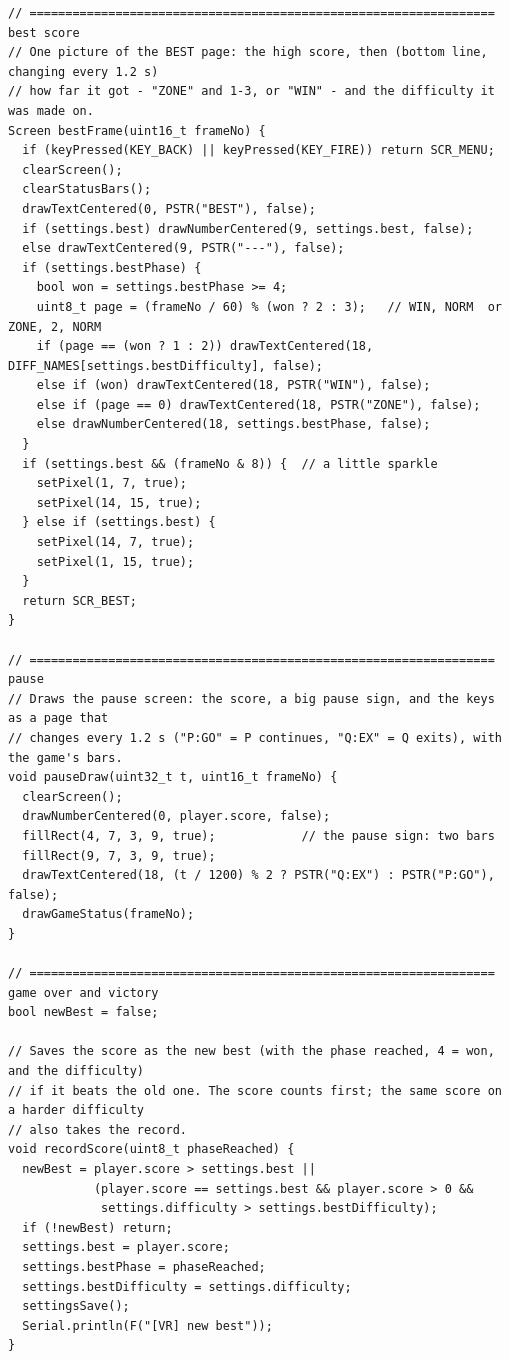 \documentclass[11pt,a4paper]{article}
\begin{document}
\begin{lstlisting}[language=Arduino]
// ================================================================= best score
// One picture of the BEST page: the high score, then (bottom line, changing every 1.2 s)
// how far it got - "ZONE" and 1-3, or "WIN" - and the difficulty it was made on.
Screen bestFrame(uint16_t frameNo) {
  if (keyPressed(KEY_BACK) || keyPressed(KEY_FIRE)) return SCR_MENU;
  clearScreen();
  clearStatusBars();
  drawTextCentered(0, PSTR("BEST"), false);
  if (settings.best) drawNumberCentered(9, settings.best, false);
  else drawTextCentered(9, PSTR("---"), false);
  if (settings.bestPhase) {
    bool won = settings.bestPhase >= 4;
    uint8_t page = (frameNo / 60) % (won ? 2 : 3);   // WIN, NORM  or  ZONE, 2, NORM
    if (page == (won ? 1 : 2)) drawTextCentered(18, DIFF_NAMES[settings.bestDifficulty], false);
    else if (won) drawTextCentered(18, PSTR("WIN"), false);
    else if (page == 0) drawTextCentered(18, PSTR("ZONE"), false);
    else drawNumberCentered(18, settings.bestPhase, false);
  }
  if (settings.best && (frameNo & 8)) {  // a little sparkle
    setPixel(1, 7, true);
    setPixel(14, 15, true);
  } else if (settings.best) {
    setPixel(14, 7, true);
    setPixel(1, 15, true);
  }
  return SCR_BEST;
}

// ================================================================= pause
// Draws the pause screen: the score, a big pause sign, and the keys as a page that
// changes every 1.2 s ("P:GO" = P continues, "Q:EX" = Q exits), with the game's bars.
void pauseDraw(uint32_t t, uint16_t frameNo) {
  clearScreen();
  drawNumberCentered(0, player.score, false);
  fillRect(4, 7, 3, 9, true);            // the pause sign: two bars
  fillRect(9, 7, 3, 9, true);
  drawTextCentered(18, (t / 1200) % 2 ? PSTR("Q:EX") : PSTR("P:GO"), false);
  drawGameStatus(frameNo);
}

// ================================================================= game over and victory
bool newBest = false;

// Saves the score as the new best (with the phase reached, 4 = won, and the difficulty)
// if it beats the old one. The score counts first; the same score on a harder difficulty
// also takes the record.
void recordScore(uint8_t phaseReached) {
  newBest = player.score > settings.best ||
            (player.score == settings.best && player.score > 0 &&
             settings.difficulty > settings.bestDifficulty);
  if (!newBest) return;
  settings.best = player.score;
  settings.bestPhase = phaseReached;
  settings.bestDifficulty = settings.difficulty;
  settingsSave();
  Serial.println(F("[VR] new best"));
}


\end{lstlisting}
\end{document}
